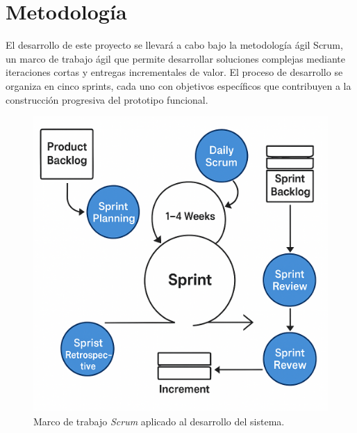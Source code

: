 \documentclass[conference]{IEEEtran}
\begin{document}
\section{Metodología}
El desarrollo de este proyecto se llevará a cabo bajo la metodología ágil
Scrum, un marco de trabajo ágil que permite desarrollar soluciones complejas
mediante iteraciones cortas y entregas incrementales de valor. El proceso de
desarrollo se organiza en cinco sprints, cada uno con objetivos específicos que
contribuyen a la construcción progresiva del prototipo funcional.\\
\begin{figure}[htbp]
    \centerline{\includegraphics[width=\linewidth]{referencia de metodologia.png}}
    \caption{Marco de trabajo \textit{Scrum} aplicado al desarrollo del sistema.}
    \label{fig}
\end{figure}
\end{document}
